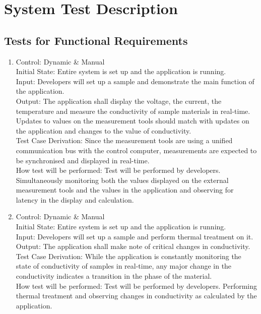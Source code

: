 \documentclass[12pt, titlepage]{article}
\begin{document}

\section{System Test Description}
	
\subsection{Tests for Functional Requirements}

\begin{enumerate}[{FR-T}1.]
    \item Control: Dynamic \& Manual \\
    Initial State: Entire system is set up and the application is running.\\
    Input: Developers will set up a sample and demonstrate the main function of the application.\\
    Output: The application shall display the voltage, the current, the temperature and measure the conductivity of sample materials in real-time. Updates to values on the measurement tools should match with updates on the application and changes to the value of conductivity. \\
    Test Case Derivation: Since the measurement tools are using a unified communication bus with the control computer, measurements are expected to be synchronised and displayed in real-time.\\
    How test will be performed: Test will be performed by developers. Simultaneously monitoring both the values displayed on the external measurement tools and the values in the application and observing for latency in the display and calculation.
    
    \item Control: Dynamic \& Manual\\
    Initial State: Entire system is set up and the application is running.\\
    Input: Developers will set up a sample and perform thermal treatment on it.\\
    Output: The application shall make note of critical changes in conductivity.\\
    Test Case Derivation: While the application is constantly monitoring the state of conductivity of samples in real-time, any major change in the conductivity indicates a transition in the phase of the material.\\
    How test will be performed: Test will be performed by developers. Performing thermal treatment and observing changes in conductivity as calculated by the application.
    

\end{enumerate}
\end{document}
